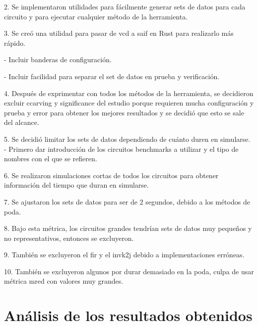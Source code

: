  2. Se implementaron utilidades para fácilmente generar sets de datos para cada circuito y para ejecutar cualquier método de la herramienta.

 3. Se creó una utilidad para pasar de vcd a saif en Rust para realizarlo más rápido.

   - Incluir banderas de configuración.

   - Incluir facilidad para separar el set de datos en prueba y verificación.

 4. Después de exprimentar con todos los métodos de la herramienta, se
 decidieron excluir ccarving y significance del estudio porque requieren mucha
 configuración y prueba y error para obtener los mejores resultados y se decidió
 que esto se sale del alcance.

 5. Se decidió limitar los sets de datos dependiendo de cuánto duren en simularse.
   - Primero dar introducción de los circuitos benchmarks a utilizar y el tipo de nombres con el que se refieren.

 6. Se realizaron simulaciones cortas de todos los circuitos para obtener información del tiempo que duran en simularse.

 7. Se ajustaron los sets de datos para ser de 2 segundos, debido a los métodos de poda.

 8. Bajo esta métrica, los circuitos grandes tendrían sets de datos muy pequeños y no representativos, entonces se excluyeron.

 9. También se excluyeron el fir y el invk2j debido a implementaciones erróneas.

 10. También se excluyeron algunos por durar demasiado en la poda, culpa de usar métrica mred con valores muy grandes.

\section{Análisis de los resultados obtenidos}

